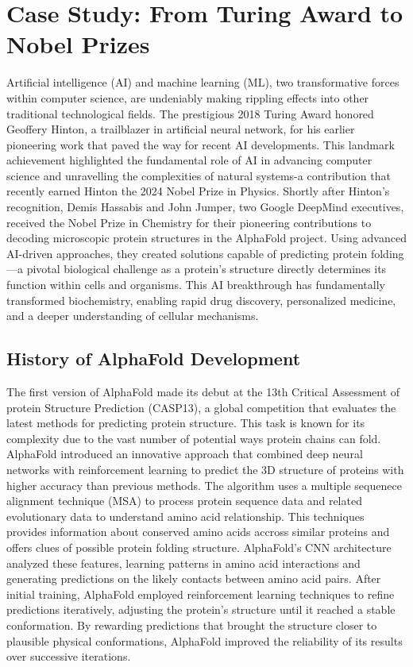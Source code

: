 \documentclass[a4paper]{article}
\begin{document}
\section{Case Study: From Turing Award to Nobel Prizes}
Artificial intelligence (AI) and machine learning (ML), two transformative forces within computer science, are undeniably making rippling effects into other traditional technological fields. The prestigious 2018 Turing Award honored Geoffery Hinton, a trailblazer in artificial neural network, for his earlier pioneering work that paved the way for recent AI developments. This landmark achievement highlighted the fundamental role of AI in advancing computer science and unravelling the complexities of natural systems-a contribution that recently earned Hinton the 2024 Nobel Prize in Physics. Shortly after Hinton's recognition, Demis Hassabis and John Jumper, two Google DeepMind executives, received the Nobel Prize in Chemistry for their pioneering contributions to decoding microscopic protein structures in the AlphaFold project.
Using advanced AI-driven approaches, they created solutions capable of predicting protein folding—a pivotal biological challenge as a protein’s structure directly determines its function within cells and organisms. This AI breakthrough has fundamentally transformed biochemistry, enabling rapid drug discovery, personalized medicine, and a deeper understanding of cellular mechanisms.

\subsection{History of AlphaFold Development}

The first version of AlphaFold \cite{senior_improved_2020} made its debut at the 13th Critical Assessment of protein Structure Prediction (CASP13), a global competition that evaluates the latest methods for predicting protein structure. This task is known for its complexity due to the vast number of potential ways protein chains can fold. AlphaFold introduced an innovative approach that combined deep neural networks with reinforcement learning to predict the 3D structure of proteins with higher accuracy than previous methods. The algorithm uses a multiple sequenece alignment technique (MSA) to process protein sequence data and related evolutionary data to understand amino acid relationship. This techniques provides information about conserved amino acids accross similar proteins and offers clues of possible protein folding structure. AlphaFold’s CNN architecture analyzed these features, learning patterns in amino acid interactions and generating predictions on the likely contacts between amino acid pairs. After initial training, AlphaFold employed reinforcement learning techniques to refine predictions iteratively, adjusting the protein’s structure until it reached a stable conformation. By rewarding predictions that brought the structure closer to plausible physical conformations, AlphaFold improved the reliability of its results over successive iterations.
\end{document}
